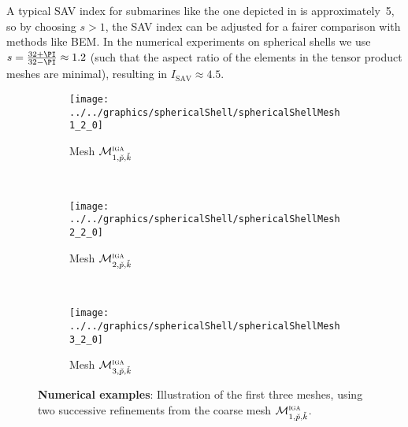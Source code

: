 A typical SAV index for submarines like the one depicted in  is approximately~5, so by choosing $s>1$, the SAV index can be adjusted for a fairer comparison with methods like BEM. In the numerical experiments on spherical shells we use $s=\frac{32+\PI}{32-\PI}\approx 1.2$ (such that the aspect ratio of the elements in the tensor product meshes are minimal), resulting in $I_{\mathrm{SAV}}\approx 4.5$.
\begin{figure}
	\centering
	\begin{subfigure}{0.3\textwidth}
		\centering
		\texttt{[image: ../../graphics/sphericalShell/sphericalShellMesh1\_2\_0]}
		\caption{Mesh ${\cal M}_{1,\check{p},\check{k}}^{\textsc{iga}}$}
		\label{Fig2:SphericalShellMeshes1}
    \end{subfigure}
    ~
	\begin{subfigure}{0.3\textwidth}
		\centering
		\texttt{[image: ../../graphics/sphericalShell/sphericalShellMesh2\_2\_0]}
		\caption{Mesh ${\cal M}_{2,\check{p},\check{k}}^{\textsc{iga}}$}
		\label{Fig2:SphericalShellMeshes2}
    \end{subfigure}
    ~
	\begin{subfigure}{0.3\textwidth}
		\centering
		\texttt{[image: ../../graphics/sphericalShell/sphericalShellMesh3\_2\_0]}
		\caption{Mesh ${\cal M}_{3,\check{p},\check{k}}^{\textsc{iga}}$}
		\label{Fig2:SphericalShellMeshes3}
    \end{subfigure}
	\caption{\textbf{Numerical examples}: Illustration of the first three meshes, using two successive refinements from the coarse mesh ${\cal M}_{1,\check{p},\check{k}}^{\textsc{iga}}$.}
	\label{Fig2:SphericalShellMeshes}
\end{figure}

